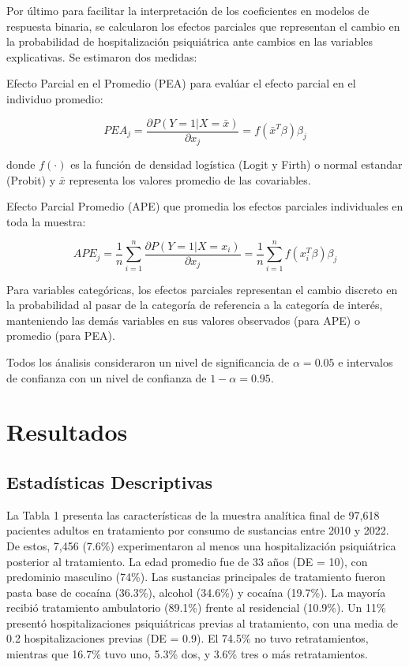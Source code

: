 \documentclass[
  spanish,
  10pt,
]{article}
\begin{document}
Por último para facilitar la interpretación de los coeficientes en
modelos de respuesta binaria, se calcularon los efectos parciales que
representan el cambio en la probabilidad de hospitalización psiquiátrica
ante cambios en las variables explicativas. Se estimaron dos medidas:

Efecto Parcial en el Promedio (PEA) para evalúar el efecto parcial en el
individuo promedio:

\[PEA_j = \frac{\partial P(Y=1|X=\bar{x})}{\partial x_j} = f(\bar{x}^T\beta)\beta_j\]

donde \(f(\cdot)\) es la función de densidad logística (Logit y Firth) o
normal estandar (Probit) y \(\bar{x}\) representa los valores promedio
de las covariables.

Efecto Parcial Promedio (APE) que promedia los efectos parciales
individuales en toda la muestra:

\[APE_j = \frac{1}{n}\sum_{i=1}^{n} \frac{\partial P(Y=1|X=x_i)}{\partial x_j} = \frac{1}{n}\sum_{i=1}^{n} f(x_i^T\beta)\beta_j\]

Para variables categóricas, los efectos parciales representan el cambio
discreto en la probabilidad al pasar de la categoría de referencia a la
categoría de interés, manteniendo las demás variables en sus valores
observados (para APE) o promedio (para PEA).

Todos los ánalisis consideraron un nivel de significancia de
\(\alpha=0.05\) e intervalos de confianza con un nivel de confianza de
\(1-\alpha=0.95\).

\newpage

\section{Resultados}\label{resultados}

\subsection{Estadísticas
Descriptivas}\label{estaduxedsticas-descriptivas}

La Tabla 1 presenta las características de la muestra analítica final de
97,618 pacientes adultos en tratamiento por consumo de sustancias entre
2010 y 2022. De estos, 7,456 (7.6\%) experimentaron al menos una
hospitalización psiquiátrica posterior al tratamiento. La edad promedio
fue de 33 años (DE = 10), con predominio masculino (74\%). Las
sustancias principales de tratamiento fueron pasta base de cocaína
(36.3\%), alcohol (34.6\%) y cocaína (19.7\%). La mayoría recibió
tratamiento ambulatorio (89.1\%) frente al residencial (10.9\%). Un 11\%
presentó hospitalizaciones psiquiátricas previas al tratamiento, con una
media de 0.2 hospitalizaciones previas (DE = 0.9). El 74.5\% no tuvo
retratamientos, mientras que 16.7\% tuvo uno, 5.3\% dos, y 3.6\% tres o
más retratamientos.
\end{document}
